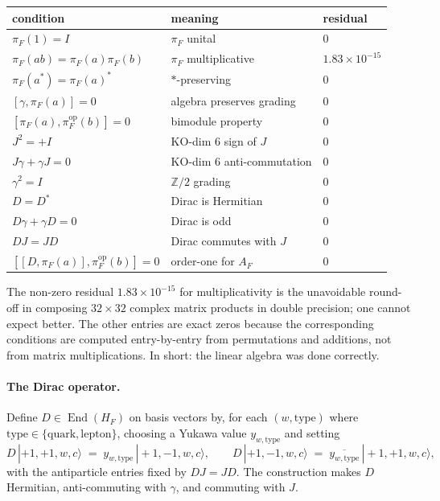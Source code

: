 \documentclass[11pt,a4paper]{article}
\begin{document}
\begin{center}
\renewcommand{\arraystretch}{1.1}
\begin{tabular}{lll}
\toprule
condition & meaning & residual \\
\midrule
$\pi_F(1) = I$ & $\pi_F$ unital & $0$ \\
$\pi_F(ab) = \pi_F(a)\pi_F(b)$ & $\pi_F$ multiplicative & $1.83 \times 10^{-15}$ \\
$\pi_F(a^*) = \pi_F(a)^*$ & $*$-preserving & $0$ \\
$[\gamma, \pi_F(a)] = 0$ & algebra preserves grading & $0$ \\
$[\pi_F(a), \pi_F^{\mathrm{op}}(b)] = 0$ & bimodule property & $0$ \\
$J^2 = +I$ & KO-dim 6 sign of $J$ & $0$ \\
$J\gamma + \gamma J = 0$ & KO-dim 6 anti-commutation & $0$ \\
$\gamma^2 = I$ & $\mathbb{Z}/2$ grading & $0$ \\
$D = D^*$ & Dirac is Hermitian & $0$ \\
$D\gamma + \gamma D = 0$ & Dirac is odd & $0$ \\
$DJ = JD$ & Dirac commutes with $J$ & $0$ \\
$[[D, \pi_F(a)], \pi_F^{\mathrm{op}}(b)] = 0$ & order-one for $A_F$ & $0$ \\
\bottomrule
\end{tabular}
\end{center}

\bigskip

The non-zero residual $1.83 \times 10^{-15}$ for multiplicativity is the
unavoidable round-off in composing $32 \times 32$ complex matrix products in
double precision; one cannot expect better. The other entries are exact zeros
because the corresponding conditions are computed entry-by-entry from
permutations and additions, not from matrix multiplications. In short: the
linear algebra was done correctly.

\paragraph{The Dirac operator.}
Define $D \in \operatorname{End}(H_F)$ on basis vectors by, for each
$(w, \mathrm{type})$ where $\mathrm{type} \in \{\mathrm{quark}, \mathrm{lepton}\}$,
choosing a Yukawa value $y_{w, \mathrm{type}}$ and setting
\[
  D\, |+1, +1, w, c\rangle \;=\; y_{w, \mathrm{type}}\, |+1, -1, w, c\rangle,
  \qquad
  D\, |+1, -1, w, c\rangle \;=\; \overline{y_{w, \mathrm{type}}}\, |+1, +1, w, c\rangle,
\]
with the antiparticle entries fixed by $DJ = JD$. The construction makes $D$
Hermitian, anti-commuting with $\gamma$, and commuting with $J$.
\end{document}
